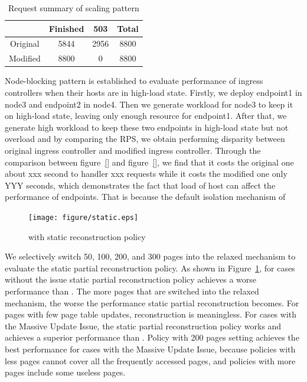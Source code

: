 \hspace{0pt}
\begin{table}[htbp]
 \begin{center}
  \begin{tabular}{c|c|c|c}
   \hline
            & Finished & 503  & Total \\  \hline
   Original & 5844     & 2956 & 8800  \\ \hline
   Modified & 8800     & 0    & 8800  \\ \hline
  \end{tabular}
 \end{center}
 \caption{Request summary of scaling pattern}
 \label{table:request_summary2}
\end{table}

Node-blocking pattern is established to evaluate performance of ingress controllers when their hosts are in high-load state. Firstly, we deploy endpoint1 in node3 and endpoint2 in node4.
Then we generate workload for node3 to keep it on high-load state, leaving only enough resource for endpoint1. After that, we generate high workload to keep these two endpoints in
high-load state but not overload and by comparing the RPS, we obtain performing disparity between original ingress controller and modified ingress controller. Through the comparison between
figure~{\ref{}} and figure~{\ref{}}, we find that it costs the original one about xxx second to handler xxx requests while it costs the modified one only YYY seconds, which demonstrates the fact
that load of host can affect the performance of endpoints. That is because the default isolation mechanism of 



\begin{figure}[!htb]
 \centering
 \texttt{[image: figure/static.eps]}\\
 \caption{\name{} with static reconstruction policy}
 \label{fig:static}
\end{figure}

We selectively switch 50, 100, 200, and 300 pages into the relaxed mechanism to evaluate the static partial reconstruction policy.
As shown in Figure~\ref{fig:static}, for cases without the issue static partial reconstruction policy achieves a worse performance than \gvirt{}.
The more pages that are switched into the relaxed mechanism, the worse the performance static partial reconstruction becomes.
For pages with few page table updates, reconstruction is meaningless. For cases with the Massive Update Issue, the static partial reconstruction
policy works and achieves a superior performance than \gvirt{}. Policy with 200 pages setting achieves the best performance for cases with the
Massive Update Issue, because policies with less pages cannot cover all the frequently accessed pages,
and policies with more pages include some useless pages.


